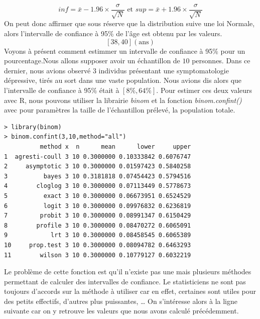 $$inf = \bar{x} - 1.96\times\frac{\sigma}{\sqrt{N}}\textrm{ et }sup = \bar{x} + 1.96\times\frac{\sigma}{\sqrt{N}}$$
On peut donc affirmer que sous réserve que la distribution suive une loi Normale, alors l'intervalle de confiance à 95\% de l'âge est obtenu par les valeurs.
$$[38,40] (\textrm{ans})$$
Voyons à présent comment estimmer un intervalle de confiance à 95\% pour un pourcentage.\newline Nous allons supposer avoir un échantillon de $10$ personnes. Dans ce dernier, nous avions observé 3 individus présentant une symptomatologie dépressive, tirés au sort dans une vaste population.\newline
Nous avions dis alors que l'intervalle de confiance à 95\% était à $[8\%,64\%]$.\newline
Pour estimer ces deux valeurs avec R, nous pouvons utiliser la librairie \textit{binom} et la fonction \textit{binom.confint()} avec pour paramètres la taille de l'échantillon prélevé, la population totale.
\begin{lstlisting}[language=html]
> library(binom)
> binom.confint(3,10,method="all")
          method x  n      mean      lower     upper
1  agresti-coull 3 10 0.3000000 0.10333842 0.6076747
2     asymptotic 3 10 0.3000000 0.01597423 0.5840258
3          bayes 3 10 0.3181818 0.07454423 0.5794516
4        cloglog 3 10 0.3000000 0.07113449 0.5778673
5          exact 3 10 0.3000000 0.06673951 0.6524529
6          logit 3 10 0.3000000 0.09976832 0.6236819
7         probit 3 10 0.3000000 0.08991347 0.6150429
8        profile 3 10 0.3000000 0.08470272 0.6065091
9            lrt 3 10 0.3000000 0.08458545 0.6065389
10     prop.test 3 10 0.3000000 0.08094782 0.6463293
11        wilson 3 10 0.3000000 0.10779127 0.6032219
\end{lstlisting}

Le problème de cette fonction est qu'il n'existe pas une mais plusieurs méthodes permettant de calculer des intervalles de confiance.\newline
Le statisticiens ne sont pas toujours d'accords sur la méthode à utiliser car en effet, certaines sont utiles pour des petits effectifs, d'autres plus puissantes, \dots \newline
On s'intéresse alors à la ligne suivante car on y retrouve les valeurs que nous avons calculé précédemment. 

